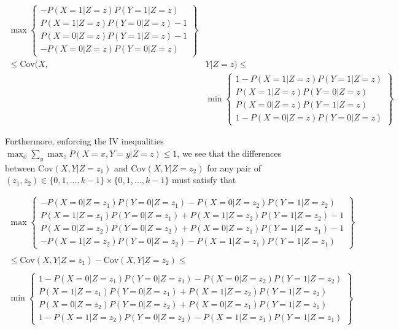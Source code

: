 \documentclass[
]{article}
\theoremstyle{plain}
\begin{document}
\[
\begin{aligned}
  \max\left\{ 
      \begin{array}{c}
        -P(X = 1 | Z = z)P(Y = 1 | Z = z) \\ 
        P(X = 1 | Z = z)P(Y = 0 | Z = z) - 1\\
        P(X = 0 | Z = z)P(Y = 1 | Z = z) - 1\\
        - P(X = 0 | Z = z)P(Y = 0 | Z = z)
      \end{array} 
    \right\} & \\ 
    \le \text{Cov}(X, &Y | Z = z) \le \\
    &\min\left\{ 
      \begin{array}{c}
        1 - P(X = 1 | Z = z)P(Y = 1 | Z = z) \\ 
        P(X = 1 | Z = z)P(Y = 0 | Z = z) \\
        P(X = 0 | Z = z)P(Y = 1 | Z = z) \\
        1 - P(X = 0 | Z = z)P(Y = 0 | Z = z)
      \end{array} 
    \right\}
\end{aligned}
\]

Furthermore, enforcing the IV inequalities \(\max_x \sum_y \max_z P(X = x, Y = y | Z = z) \le 1\), we see that the differences between \(\text{Cov}(X, Y | Z = z_1)\) and \(\text{Cov}(X, Y | Z = z_2)\) for any pair of \((z_1, z_2) \in \{0,1,...,k-1\} \times \{0,1,...,k-1\}\) must satisfy that

\[
\begin{aligned}
  \max\left\{ 
      \begin{array}{c}
        -P(X = 0 | Z = z_1)P(Y = 0 | Z = z_1) - P(X = 0 | Z = z_2)P(Y = 1 | Z = z_2) \\ 
        P(X = 1 | Z = z_1)P(Y = 0 | Z = z_1) + P(X = 1 | Z = z_2)P(Y = 1 | Z = z_2) -1 \\
        P(X = 0 | Z = z_2)P(Y = 0 | Z = z_2) + P(X = 0 | Z = z_1)P(Y = 1 | Z = z_1) - 1 \\
        -P(X = 1 | Z = z_2)P(Y = 0 | Z = z_2) - P(X = 1 | Z = z_1)P(Y = 1 | Z = z_1)
      \end{array} 
    \right\} \qquad \qquad & \\ \\
    \le \text{Cov}(X,Y | Z = z_1) - \text{Cov}(X,Y | Z = z_2) \le \qquad \qquad \qquad \qquad  \qquad& \\ \\
    \min\left\{ 
      \begin{array}{c}
        1 -P(X = 0 | Z = z_1)P(Y = 0 | Z = z_1) - P(X = 0 | Z = z_2)P(Y = 1 | Z = z_2) \\ 
        P(X = 1 | Z = z_1)P(Y = 0 | Z = z_1) + P(X = 1 | Z = z_2)P(Y = 1 | Z = z_2) \\
        P(X = 0 | Z = z_2)P(Y = 0 | Z = z_2) + P(X = 0 | Z = z_1)P(Y = 1 | Z = z_1) \\
        1 - P(X = 1 | Z = z_2)P(Y = 0 | Z = z_2) - P(X = 1 | Z = z_1)P(Y = 1 | Z = z_1)
      \end{array} 
    \right\} & 
\end{aligned}
\]
\end{document}
